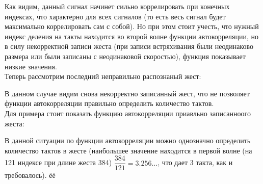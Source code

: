 Как видим, данный сигнал начинет сильно коррелировать при конечных индексах, что характерно для всех сигналов (то есть весь сигнал будет максимально коррелировать сам с собой). Но при этом стоит учесть, что нужный индекс деления на такты находится во второй волне функции автокорреляции, но в силу некорректной записи жеста (при записи встряхивания были неодинаково размера или были записаны с неодинаковой скоростью), функция показывает низкие значения. \\

Теперь рассмотрим последний неправильно распознаный жест:


\begin{figure}[H]
\end{figure}
В данном случае видим снова некорректно записанный жест, что не позволяет функции автокорреляции правильно определить количество тактов. \\

Для примера стоит показать функцию автокорреляции приавльно записанноого жеста:

\begin{figure}[H]
\end{figure}

В данной ситуации по функции автокорреляции можно однозначно определить количество тактов в жесте (наибольшее значение находится в первой волне (на 121 индексе при длине жеста 384) $\dfrac{384}{121} = 3.256 \ldots$, что дает 3 такта, как и требовалось). ёё

